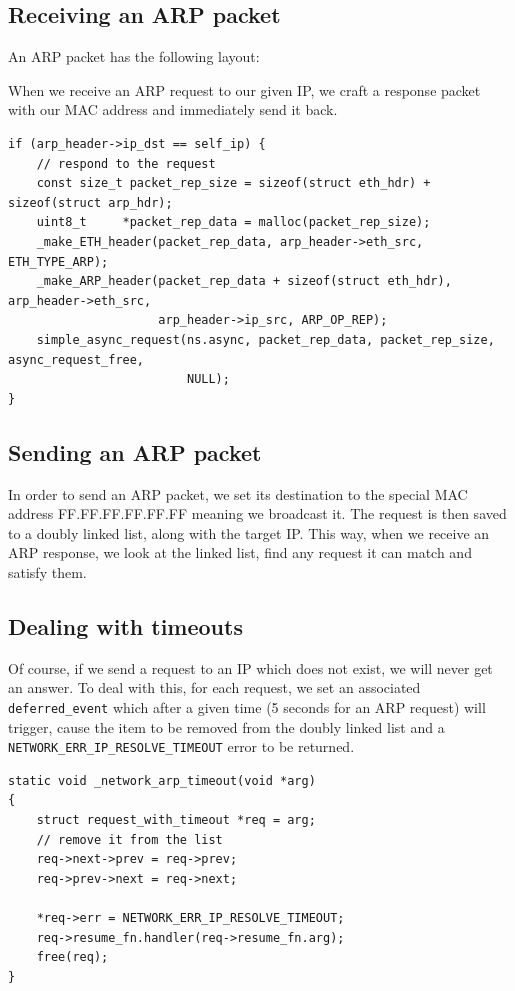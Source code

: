 \subsection{Receiving an ARP packet}

An ARP packet has the following layout:


When we receive an ARP request to our given IP, we craft a response packet with our MAC address and immediately send it back.

\begin{lstlisting}[caption={Sending back an ARP response}]
if (arp_header->ip_dst == self_ip) {
    // respond to the request
    const size_t packet_rep_size = sizeof(struct eth_hdr) + sizeof(struct arp_hdr);
    uint8_t     *packet_rep_data = malloc(packet_rep_size);
    _make_ETH_header(packet_rep_data, arp_header->eth_src, ETH_TYPE_ARP);
    _make_ARP_header(packet_rep_data + sizeof(struct eth_hdr), arp_header->eth_src,
                     arp_header->ip_src, ARP_OP_REP);
    simple_async_request(ns.async, packet_rep_data, packet_rep_size, async_request_free,
                         NULL);
}
\end{lstlisting} 

\subsection{Sending an ARP packet}

In order to send an ARP packet, we set its destination to the special MAC address FF.FF.FF.FF.FF.FF meaning we broadcast it. The request is then saved to a doubly linked list, along with the target IP. This way, when we receive an ARP response, we look at the linked list, find any request it can match and satisfy them.

\subsection{Dealing with timeouts}

Of course, if we send a request to an IP which does not exist, we will never get an answer. To deal with this, for each request, we set an associated \verb|deferred_event| which after a given time (5 seconds for an ARP request) will trigger, cause the item to be removed from the doubly linked list and a \verb|NETWORK_ERR_IP_RESOLVE_TIMEOUT| error to be returned.

\begin{lstlisting}[caption={dealing with timeouts}]
static void _network_arp_timeout(void *arg)
{
    struct request_with_timeout *req = arg;
    // remove it from the list
    req->next->prev = req->prev;
    req->prev->next = req->next;

    *req->err = NETWORK_ERR_IP_RESOLVE_TIMEOUT;
    req->resume_fn.handler(req->resume_fn.arg);
    free(req);
}
\end{lstlisting}  

